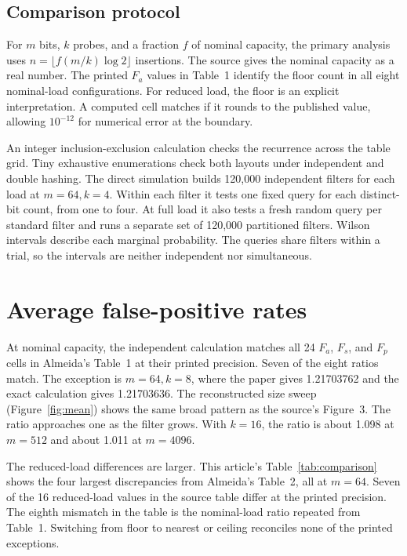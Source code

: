 \subsection{Comparison protocol}

For $m$ bits, $k$ probes, and a fraction $f$ of nominal capacity, the
primary analysis uses $n=\lfloor f(m/k)\log 2\rfloor$ insertions. The
source gives the nominal capacity as a real number. The printed $F_a$ values in Table~1 identify the floor count in all
eight nominal-load configurations.
For reduced load, the floor is an explicit interpretation. A computed
cell matches if it rounds to the published value, allowing $10^{-12}$
for numerical error at the boundary.

An integer inclusion-exclusion calculation checks the recurrence across
the table grid. Tiny exhaustive enumerations check both layouts under
independent and double hashing. The direct simulation builds 120,000
independent filters for each load at $m=64,k=4$. Within each filter it
tests one fixed query for each distinct-bit count, from one to four. At
full load it also tests a fresh random query per standard filter and
runs a separate set of 120,000 partitioned filters. Wilson intervals
describe each marginal probability. The queries share filters within
a trial, so the intervals are neither independent nor simultaneous.

\section{Average false-positive rates}
\label{sec:mean}

At nominal capacity, the independent calculation matches all 24
$F_a$, $F_s$, and $F_p$ cells in Almeida's Table~1 at their printed
precision. Seven of the eight ratios match. The exception is
$m=64,k=8$, where the paper gives 1.21703762 and the exact calculation
gives 1.21703636. The reconstructed size sweep (Figure~\ref{fig:mean})
shows the same broad pattern as the source's Figure~3. The ratio
approaches one as the filter grows. With $k=16$, the ratio is about
1.098 at $m=512$ and about 1.011 at $m=4096$.



The reduced-load differences are larger. This article's Table~\ref{tab:comparison}
shows the four largest discrepancies from Almeida's Table~2, all at $m=64$. Seven of the
16 reduced-load values in the source table differ at the printed
precision. The eighth mismatch in the table is the nominal-load
ratio repeated from Table~1. Switching from floor to nearest or ceiling
reconciles none of the printed exceptions.


